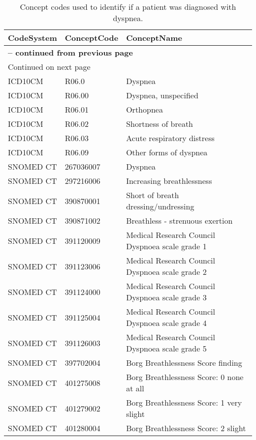 \begin{longtable}{p{}p{}p{}}
\caption{Concept codes used to identify if a patient was diagnosed with dyspnea.} \\ 
 CodeSystem & ConceptCode & ConceptName \\ 
  \hline 
\endfirsthead 
\multicolumn{3}{p{\textwidth}}{{ \bfseries \tablename \thetable{} -- continued from previous page}} \ 
\hline CodeSystem & ConceptCode & ConceptName \\ \hline 
\endhead 
\hline \multicolumn{3}{p{\textwidth}}{{Continued on next page}} \\ \hline 
\endfoot 
\hline 
\endlastfoot 
 \hline
ICD10CM & R06.0 & Dyspnea \\ 
  ICD10CM & R06.00 & Dyspnea, unspecified \\ 
  ICD10CM & R06.01 & Orthopnea \\ 
  ICD10CM & R06.02 & Shortness of breath \\ 
  ICD10CM & R06.03 & Acute respiratory distress \\ 
  ICD10CM & R06.09 & Other forms of dyspnea \\ 
  SNOMED CT & 267036007 & Dyspnea \\ 
  SNOMED CT & 297216006 & Increasing breathlessness \\ 
  SNOMED CT & 390870001 & Short of breath dressing/undressing \\ 
  SNOMED CT & 390871002 & Breathless - strenuous exertion \\ 
  SNOMED CT & 391120009 & Medical Research Council Dyspnoea scale grade 1 \\ 
  SNOMED CT & 391123006 & Medical Research Council Dyspnoea scale grade 2 \\ 
  SNOMED CT & 391124000 & Medical Research Council Dyspnoea scale grade 3 \\ 
  SNOMED CT & 391125004 & Medical Research Council Dyspnoea scale grade 4 \\ 
  SNOMED CT & 391126003 & Medical Research Council Dyspnoea scale grade 5 \\ 
  SNOMED CT & 397702004 & Borg Breathlessness Score finding \\ 
  SNOMED CT & 401275008 & Borg Breathlessness Score: 0 none at all \\ 
  SNOMED CT & 401279002 & Borg Breathlessness Score: 1 very slight \\ 
  SNOMED CT & 401280004 & Borg Breathlessness Score: 2 slight \\ 

\end{longtable}

